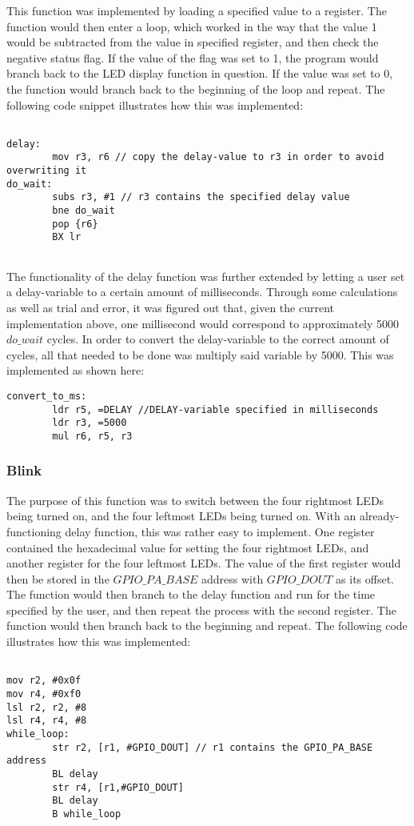 This function was implemented by loading a specified value to a register. The function would then enter a loop, which worked in the way that the value 1 would be subtracted from the value in specified register, and then check the negative status flag. If the value of the flag was set to 1, the program would branch back to the LED display function in question. If the value was set to 0, the function would branch back to the beginning of the loop and repeat. The following code snippet illustrates how this was implemented:

\begin{lstlisting}

delay:
        mov r3, r6 // copy the delay-value to r3 in order to avoid overwriting it
do_wait:
        subs r3, #1 // r3 contains the specified delay value
        bne do_wait
        pop {r6}
        BX lr
        
\end{lstlisting}

The functionality of the delay function was further extended by letting a user set a delay-variable to a certain amount of milliseconds. Through some calculations as well as trial and error, it was figured out that, given the current implementation above, one millisecond would correspond to approximately 5000 $do\_wait$ cycles. In order to convert the delay-variable to the correct amount of cycles, all that needed to be done was multiply said variable by 5000. This was implemented as shown here:

\begin{lstlisting}
convert_to_ms:
        ldr r5, =DELAY //DELAY-variable specified in milliseconds
        ldr r3, =5000
        mul r6, r5, r3
\end{lstlisting}


\subsubsection{Blink}

The purpose of this function was to switch between the four rightmost LEDs being turned on, and the four leftmost LEDs being turned on. With an already-functioning delay function, this was rather easy to implement. One register contained the hexadecimal value for setting the four rightmost LEDs, and another register for the four leftmost LEDs. The value of the first register would then be stored in the $GPIO\_PA\_BASE$ address with $GPIO\_DOUT$ as its offset. The function would then branch to the delay function and run for the time specified by the user, and then repeat the process with the second register. The function would then branch back to the beginning and repeat. The following code illustrates how this was implemented:
\begin{lstlisting}

mov r2, #0x0f
mov r4, #0xf0
lsl r2, r2, #8
lsl r4, r4, #8
while_loop:
        str r2, [r1, #GPIO_DOUT] // r1 contains the GPIO_PA_BASE address
        BL delay
        str r4, [r1,#GPIO_DOUT]
        BL delay
        B while_loop


\end{lstlisting}

